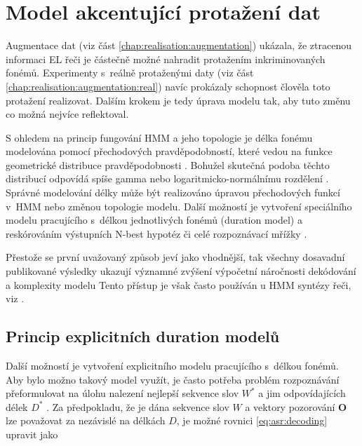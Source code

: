 \section{Model akcentující protažení dat}
\label{chap:realisation:durationmodels}

Augmentace dat (viz část \ref{chap:realisation:augmentation}) ukázala, že ztracenou informaci EL řeči je částečně možné nahradit protažením inkriminovaných fonémů.
Experimenty s~reálně protaženými daty (viz část \ref{chap:realisation:augmentation:real}) navíc prokázaly schopnost člověla toto protažení realizovat.
Dalším krokem je tedy úprava modelu tak, aby tuto změnu co možná nejvíce reflektoval.

S ohledem na princip fungování HMM a jeho topologie je délka fonému modelována pomocí přechodových pravděpodobností, které vedou na funkce geometrické distribuce pravděpodobnosti \cite{Rabiner1989}.
Bohužel skutečná podoba těchto distribucí odpovídá spíše gamma nebo logaritmicko-normálnímu rozdělení \cite{Alumae2014}.
Správné modelování délky může být realizováno úpravou přechodových funkcí v~HMM nebo změnou topologie modelu.
Další možností je vytvoření speciálního modelu pracujícího s~délkou jednotlivých fonémů (duration model) a reskórováním výstupních N-best hypotéz či celé rozpoznávací mřížky \cite{Alumae2014, Anastasakos1995, Gadde2000}.

Přestože se první uvažovaný způsob jeví jako vhodnější, tak všechny dosavadní publikované výsledky ukazují významné zvýšení výpočetní náročnosti dekódování a komplexity modelu \cite{Rabiner1989, Pylkkonen2004, Russell1985}
Tento přístup je však často používán u HMM syntézy řeči, viz \cite{Yoshimura1998}.

\subsection{Princip explicitních duration modelů}
\label{chap:realisation:durationmodels:model}

Další možností je vytvoření explicitního modelu pracujícího s~délkou fonémů. Aby bylo možno takový model využít, je často potřeba problém rozpoznávání přeformulovat na úlohu nalezení nejlepší sekvence slov $W^{*}$ a jim odpovídajících délek $D^{*}$ \cite{Alumae2014}. Za předpokladu, že je dána sekvence slov $W$ a vektory pozorování $\boldsymbol{O}$ lze považovat za nezávislé na délkách $D$, je možné rovnici \ref{eq:asr:decoding} upravit jako

